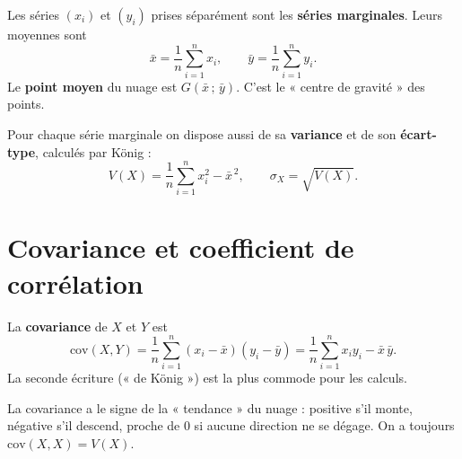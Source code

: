 \begin{definition}
Les séries $(x_i)$ et $(y_i)$ prises séparément sont les \textbf{séries marginales}. Leurs
moyennes sont
\[
\bar x=\frac1n\sum_{i=1}^{n}x_i,\qquad \bar y=\frac1n\sum_{i=1}^{n}y_i.
\]
Le \textbf{point moyen} du nuage est $G(\bar x\,;\,\bar y)$. C'est le « centre de gravité » des points.
\end{definition}

\begin{remarque}
Pour chaque série marginale on dispose aussi de sa \textbf{variance} et de son
\textbf{écart-type}, calculés par König :
\[
V(X)=\frac1n\sum_{i=1}^{n}x_i^{2}-\bar x^{\,2},\qquad \sigma_X=\sqrt{V(X)} .
\]
\end{remarque}

\begin{illus}
\end{illus}

\section{Covariance et coefficient de corrélation}

\begin{definition}[Covariance]
La \textbf{covariance} de $X$ et $Y$ est
\[
\mathrm{cov}(X,Y)=\frac1n\sum_{i=1}^{n}(x_i-\bar x)(y_i-\bar y)
=\frac1n\sum_{i=1}^{n}x_iy_i-\bar x\,\bar y .
\]
La seconde écriture (« de König ») est la plus commode pour les calculs.
\end{definition}

\begin{remarque}
La covariance a le signe de la « tendance » du nuage : positive s'il monte, négative s'il
descend, proche de $0$ si aucune direction ne se dégage. On a toujours $\mathrm{cov}(X,X)=V(X)$.
\end{remarque}

